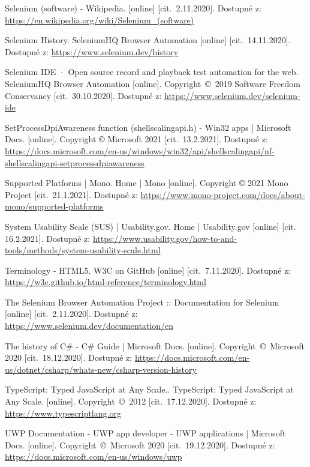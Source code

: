 \begin{thebibliography}{99}
 Selenium (software) - Wikipedia. [online] [cit.~2.11.2020]. Dostupné z: \url{https://en.wikipedia.org/wiki/Selenium_(software)}

 Selenium History. SeleniumHQ Browser Automation [online] [cit.~14.11.2020]. Dostupné z: \url{https://www.selenium.dev/history}

 Selenium IDE · Open source record and playback test automation for the web. SeleniumHQ Browser Automation [online]. Copyright~©~2019 Software Freedom Conservancy [cit.~30.10.2020]. Dostupné z: \url{https://www.selenium.dev/selenium-ide}

 SetProcessDpiAwareness function (shellscalingapi.h) - Win32 apps | Microsoft Docs. [online]. Copyright © Microsoft 2021 [cit.~13.2.2021]. Dostupné z: \url{https://docs.microsoft.com/en-us/windows/win32/api/shellscalingapi/nf-shellscalingapi-setprocessdpiawareness}

 Supported Platforms | Mono. Home | Mono [online]. Copyright © 2021 Mono Project [cit.~21.1.2021]. Dostupné z: \url{https://www.mono-project.com/docs/about-mono/supported-platforms}

 System Usability Scale (SUS) | Usability.gov. Home | Usability.gov [online] [cit. 16.2.2021]. Dostupné z: \url{https://www.usability.gov/how-to-and-tools/methods/system-usability-scale.html}

 Terminology - HTML5. W3C on GitHub [online] [cit.~7.11.2020]. Dostupné z: \url{https://w3c.github.io/html-reference/terminology.html}

 The Selenium Browser Automation Project :: Documentation for Selenium [online] [cit.~2.11.2020]. Dostupné z: \url{https://www.selenium.dev/documentation/en}

 The history of C\# - C\# Guide | Microsoft Docs. [online]. Copyright~©~Microsoft 2020 [cit.~18.12.2020]. Dostupné z: \url{https://docs.microsoft.com/en-us/dotnet/csharp/whats-new/csharp-version-history}

 TypeScript: Typed JavaScript at Any Scale.. TypeScript: Typed JavaScript at Any Scale. [online]. Copyright~©~2012 [cit.~17.12.2020]. Dostupné z: \url{https://www.typescriptlang.org}

 UWP Documentation - UWP app developer - UWP applications | Microsoft Docs. [online]. Copyright~©~Microsoft 2020 [cit.~19.12.2020]. Dostupné z: \url{https://docs.microsoft.com/en-us/windows/uwp}


\end{thebibliography}
